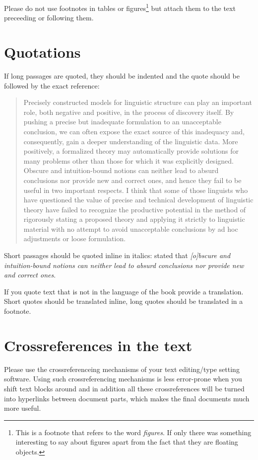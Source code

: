 Please do not use footnotes in tables or figures\footnote{
  This is a footnote that refers to the word \emph{figures}. If only there was something interesting
  to say about figures apart from the fact that they are floating objects.
} but attach them to the text preceeding or following them.


\section{Quotations}

If long passages are quoted, they should be indented and the quote should be followed by the exact reference:
\begin{quote}
Precisely constructed models for linguistic structure can play an
important role, both negative and positive, in the process of discovery 
itself. By pushing a precise but inadequate formulation to
an unacceptable conclusion, we can often expose the exact source
of this inadequacy and, consequently, gain a deeper understanding
of the linguistic data. More positively, a formalized theory may 
automatically provide solutions for many problems other than those
for which it was explicitly designed. Obscure and intuition-bound
notions can neither lead to absurd conclusions nor provide new and
correct ones, and hence they fail to be useful in two important respects. 
I think that some of those linguists who have questioned
the value of precise and technical development of linguistic theory
have failed to recognize the productive potential in the method
of rigorously stating a proposed theory and applying it strictly to
linguistic material with no attempt to avoid unacceptable conclusions 
by ad hoc adjustments or loose formulation.
\citep[5]{Chomsky57a}
\end{quote}
Short passages should be quoted inline in italics: \citet[5]{Chomsky57a} stated that \emph{[o]bscure
  and intuition-bound notions can neither lead to absurd conclusions nor provide new and
correct ones}.

If you quote text that is not in the language of the book provide a translation. Short quotes should
be translated inline, long quotes should be translated in a footnote.

\section{Crossreferences in the text}

Please use the crossreferenceing mechanisms of your text editing/type setting software. Using such
crossreferencing mechanisms is less error-prone when you shift text blocks around and in addition
all these crossreferences will be turned into hyperlinks between document parts, which makes the
final documents much more useful.

